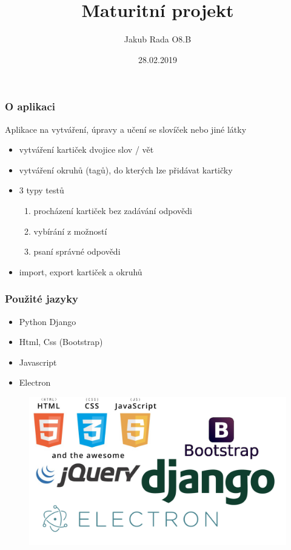 \documentclass[9pt]{beamer}
\title{Maturitní projekt}
\author{Jakub Rada O8.B}
\institute{Gymnázium Nad Alejí}
\date{28.02.2019}
\begin{document}
    \frame{\titlepage}
    \begin{frame}
        \frametitle{O aplikaci}
        Aplikace na vytváření, úpravy a učení se slovíček nebo jiné látky
        \begin{itemize}
            \item<1-> vytváření kartiček  dvojice slov / vět
            \item<1-> vytváření okruhů (tagů), do kterých lze přidávat kartičky
            \item<1-> 3 typy testů
            \begin{enumerate}
                \item<1-> procházení kartiček bez zadávání odpovědi
                \item<1-> vybírání z možností
                \item<1-> psaní správné odpovědi
            \end{enumerate}
            \item<1-> import, export kartiček a okruhů
        \end{itemize}
    \end{frame}
    \begin{frame}
        \frametitle{Použité jazyky}
        \begin{itemize}
            \item<1-> Python Django
            \item<1-> Html, Css (Bootstrap)
            \item<1-> Javascript
            \item<1-> Electron
        \end{itemize}
        \begin{figure}
            \centering
            \includegraphics[width=0.6\linewidth]{logos.jpg}
        \end{figure}
    \end{frame}
\end{document}
